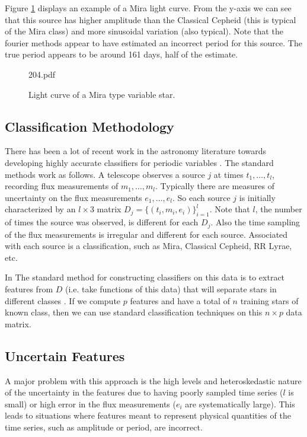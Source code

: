 \documentclass[11pt]{article}
\begin{document}
Figure \ref{fig:mira} displays an example of a Mira light curve. From the y-axis we can see that this source has higher amplitude than the Classical Cepheid (this is typical of the Mira class) and more sinusoidal variation (also typical). Note that the fourier methods appear to have estimated an incorrect period for this source. The true period appears to be around 161 days, half of the estimate.
\begin{figure}[h]
  \begin{center}
    \begin{includegraphics}[scale=.5]{204.pdf}
      \caption{Light curve of a Mira type variable star.\label{fig:mira}}
    \end{includegraphics}
  \end{center}
\end{figure}


\subsection{Classification Methodology}
There has been a lot of recent work in the astronomy literature towards developing highly accurate classifiers for periodic variables \cite{debosscher2007automated,richards2011machine,dubath2011random}. The standard methods work as follows. A telescope observes a source $j$ at times $t_{1},\ldots,t_{l}$, recording flux measurements of $m_{1},\ldots,m_{l}$. Typically there are measures of uncertainty on the flux measurements $e_{1},\ldots,e_{l}$. So each source $j$ is initially characterized by an $l \times 3$ matrix $D_j=\{(t_{i},m_{i},e_{i})\}_{i=1}^{l}$. Note that $l$, the number of times the source was observed, is different for each $D_j$. Also the time sampling of the flux measurements is irregular and different for each source. Associated with each source is a classification, such as Mira, Classical Cepheid, RR Lyrae, etc.

In The standard method for constructing classifiers on this data is to extract features from $D$ (i.e. take functions of this data) that will separate stars in different classes \cite{richards2011machine,debosscher2007automated}. If we compute $p$ features and have a total of $n$ training stars of known class, then we can use standard classification techniques on this $n\times p$ data matrix.

\subsection{Uncertain Features}
A major problem with this approach is the high levels and heteroskedastic nature of the uncertainty in the features due to having poorly sampled time series ($l$ is small) or high error in the flux measurements ($e_{i}$ are systematically large). This leads to situations where features meant to represent physical quantities of the time series, such as amplitude or period, are incorrect.
\end{document}

